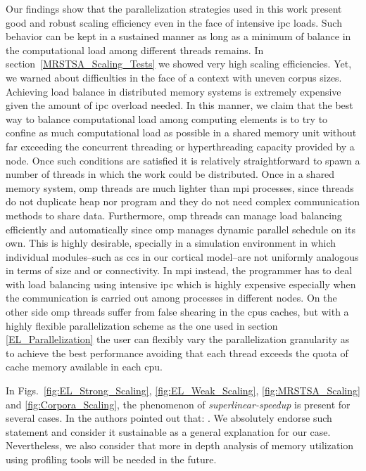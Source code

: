 \documentclass[10pt,journal,compsoc]{IEEEtran}
\begin{document}
Our findings show that the parallelization strategies used in this work present good and robust scaling efficiency even in the face of intensive \gls{ipc} loads. Such behavior can be kept in a sustained manner as long as a minimum of balance in the computational load among different threads remains. In section~\ref{MRSTSA_Scaling_Tests} we showed very high scaling efficiencies. Yet, we warned about difficulties in the face of a context with uneven corpus sizes. Achieving load balance in distributed memory systems is extremely expensive given the amount of \gls{ipc} overload needed. In this manner, we claim that the best way to balance computational load among computing elements is to try to confine as much computational load as possible in a shared memory unit without far exceeding the concurrent threading or hyperthreading capacity provided by a node. Once such conditions are satisfied it is relatively straightforward to spawn a number of threads in which the work could be distributed. Once in a shared memory system, \gls{omp} threads are much lighter than \gls{mpi} processes, since threads do not duplicate heap nor program and they do not need complex communication methods to share data. Furthermore, \gls{omp} threads can manage load balancing efficiently and automatically since \gls{omp} manages dynamic parallel schedule on its own. This is highly desirable, specially in a simulation environment in which individual modules--such as \glspl{cc} in our cortical model--are not uniformly analogous in terms of size and or connectivity. In \gls{mpi} instead, the programmer has to deal with load balancing using intensive \gls{ipc} which is highly expensive especially when the communication is carried out among processes in different nodes. On the other side \gls{omp} threads suffer from false shearing in the \glspl{cpu} caches, but with a highly flexible parallelization scheme as the one used in section \ref{EL_Parallelization} the user can flexibly vary the parallelization granularity as to achieve the best performance avoiding that each thread exceeds the quota of cache memory available in each \gls{cpu}.

In Figs.~\ref{fig:EL_Strong_Scaling}, \ref{fig:EL_Weak_Scaling}, \ref{fig:MRSTSA_Scaling} and \ref{fig:Corpora_Scaling}, the phenomenon of \emph{superlinear-speedup} is present for several cases. In \cite{7733347} the authors pointed out that: . We absolutely endorse such statement and consider it sustainable as a general explanation for our case. Nevertheless, we also consider that more in depth analysis of memory utilization using profiling tools will be needed in the future.  
\end{document}
